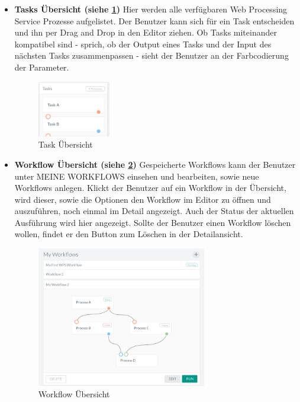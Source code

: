 \begin{itemize}
            \item \textbf{Tasks Übersicht (siehe \ref{fig:Tasks_Uebersicht})} \newline
            Hier werden alle verfügbaren \Gls{Web Processing Service} Prozesse aufgelistet. Der Benutzer kann sich für ein Task entscheiden und ihn per \Gls{Drag and Drop} in den Editor ziehen. Ob Tasks miteinander kompatibel sind - sprich, ob der Output eines Tasks und der Input des nächsten Tasks zusammenpassen - sieht der Benutzer an der Farbcodierung der Parameter.
            
            \begin{figure}[h]
            \centering
            \includegraphics[width=0.3\textwidth]{images/ui_tasks.png}
            \caption{Task Übersicht}
            \label{fig:Tasks_Uebersicht}
            \end{figure}
            
            
            \item \textbf{Workflow Übersicht (siehe \ref{fig:Workflow_Uebersicht})} \newline
            Gespeicherte Workflows kann der Benutzer unter MEINE WORKFLOWS einsehen und bearbeiten, sowie neue Workflows anlegen. Klickt der Benutzer auf ein Workflow in der Übersicht, wird dieser, sowie die Optionen den Workflow im Editor zu öffnen und auszuführen, noch einmal im Detail angezeigt. Auch der Status der aktuellen Ausführung wird hier angezeigt. Sollte der Benutzer einen Workflow löschen wollen, findet er den Button zum Löschen in der Detailansicht.
            
            \begin{figure}[h]
            \centering
            \includegraphics[width=0.7\textwidth]{images/ui_workflow.png}
            \caption{Workflow Übersicht}
            \label{fig:Workflow_Uebersicht}
            \end{figure}

        \end{itemize}
        
